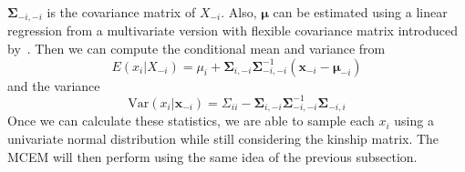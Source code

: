 \documentclass[preprint,12pt]{elsarticle}
\begin{document}
$\boldsymbol{\Sigma}_{-i,-i}$ is the covariance matrix of $X_{-i}$. 
Also, $\boldsymbol{\mu}$ can be estimated using a linear regression from a multivariate version with flexible covariance matrix introduced by~\citet{ziyatdinov2018lme4qtl}.
Then we can compute the conditional mean and variance from 
\begin{equation} 
    E(x_i|X_{-i})=\mu_i + \boldsymbol{\Sigma}_{i,-i}\boldsymbol{\Sigma}_{-i,-i}^{-1} (\mathbf{x}_{-i} - \boldsymbol{\mu}_{-i})
\end{equation}
and the variance 
\begin{equation} 
    \text{Var}(x_i|\mathbf{x}_{-i})=\Sigma_{ii} - \boldsymbol{\Sigma}_{i,-i}\boldsymbol{\Sigma}_{-i,-i}^{-1}\boldsymbol{\Sigma}_{-i,i}
\end{equation}
Once we can calculate these statistics, we are able to sample each $x_i$ using a univariate normal distribution while still considering the kinship matrix. 
The MCEM will then perform using the same idea of the previous subsection. 








\newpage



%







\end{document}
